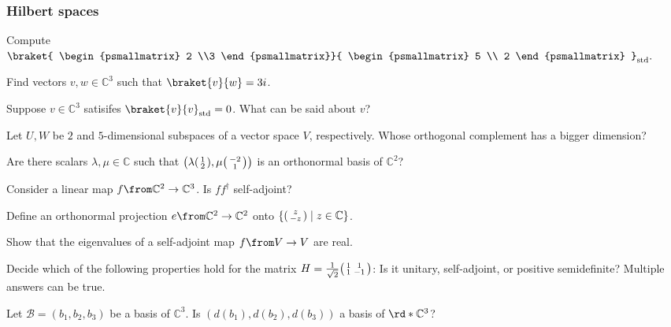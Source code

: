 \documentclass[a4paper,oneside, 12pt]{amsart}
\begin{document}
\subsubsection*{Hilbert spaces}
\begin{thmlist}
\item Compute \(\braket{
\begin{psmallmatrix}
2 \\3
\end{psmallmatrix}}{
\begin{psmallmatrix}
5 \\ 2
\end{psmallmatrix}
}_{\mathrm{std}}. \)
\item Find vectors \(v, w \in \mathbb{C}^{3}\) such that \(\braket{v}{w} = 3i\).
\item Suppose \(v\in \mathbb{C}^{3}\) satisifes \(\braket{v}{v}_{\mathrm{std}} = 0\).
What can be said about \(v\)?
\item Let \(U, W\) be \(2\) and \(5\)-dimensional subspaces of a vector space \(V\), respectively.
Whose orthogonal complement has a bigger dimension?
\item Are there scalars \(\lambda, \mu \in \mathbb{C}\) such that
\(\left(
  \lambda
  \begin{psmallmatrix}
    1 \\ 2
  \end{psmallmatrix},
  \mu
  \begin{psmallmatrix}
    -2 \\ 1
  \end{psmallmatrix}
\right)\)
is an orthonormal basis of \( \mathbb{C}^{2}\)?
\item Consider a linear map \(f \from \mathbb{C}^{2} \to \mathbb{C}^{3}\). Is \(ff^{\dagger}\) self-adjoint?
\item Define an orthonormal projection \(e \from \mathbb{C}^{2} \to \mathbb{C}^{2}\) onto
\(\left\{
  \begin{psmallmatrix}
    z \\ - z
  \end{psmallmatrix} \; \middle\vert\; z\in \mathbb{C}
\right\}\).
\item Show that the eigenvalues of a self-adjoint map \(f \from V \to V\) are real.
\item Decide which of the following properties hold for the matrix \(H=
\tfrac{1}{\sqrt{2}}
\begin{psmallmatrix}
  1 & 1 \\ 1 & -1
\end{psmallmatrix}
\):
Is it unitary, self-adjoint, or positive semidefinite? Multiple answers can be true.
\item Let \(\mathcal{B}=(b_{1}, b_{2}, b_{3})\) be a basis of \( \mathbb{C}^{3}\).
Is \((d(b_{1}), d(b_{2}), d(b_{3}))\) a basis of \(\rd*{ \mathbb{C}^{3}}\)?
\end{thmlist}
\end{document}
